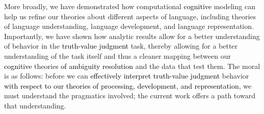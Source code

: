 \documentclass[cm]{glossa}
\newcommand{\lp}[1]{\textcolor{black}{#1}} %
\begin{document}

More broadly, we have demonstrated how computational \lp{cognitive} modeling can help us refine our theories about different aspects of language, including theories of language understanding, language development, and language representation. Importantly, we have shown how analytic results allow for a better understanding of behavior in the 
\lp{truth-value judgment}
task, thereby allowing for a better understanding of the task itself and thus a cleaner mapping between our \lp{cognitive} theories \lp{of ambiguity resolution}  and the data that test them. The moral is as follows: before we can \lp{effectively interpret} 
\lp{truth-value judgment}
behavior \lp{with respect to our theories of processing, development, and representation}, we must understand the pragmatics involved; the current work offers a path toward that understanding. 







% 

\end{document}

